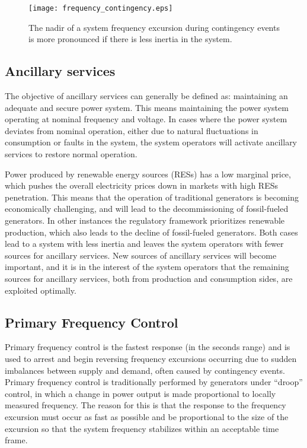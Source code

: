 \begin{figure}[htbp!]
\centering
\texttt{[image: frequency\_contingency.eps]}
\caption{The nadir of a system frequency excursion during contingency events is more pronounced if there is less inertia in the system.}
\label{fig:contingency}
\end{figure}

\subsection{Ancillary services}
The objective of ancillary services can generally be defined as: maintaining an adequate and secure power system. This means maintaining the power system operating at nominal frequency and voltage. In cases where the power system deviates from nominal operation, either due to natural fluctuations in consumption or faults in the system, the system operators will activate ancillary services to restore normal operation.

Power produced by renewable energy sources (RESs) has a low marginal price, which pushes the overall electricity prices down in markets with high RESs penetration. This means that the operation of traditional generators is becoming economically challenging, and will lead to the decommissioning of fossil-fueled generators. In other instances the regulatory framework prioritizes renewable production, which also leads to the decline of fossil-fueled generators\cite{eurelectric2015sector}. Both cases lead to a system with less inertia and leaves the system operators with fewer sources for ancillary services. New sources of ancillary services will become important, and it is in the interest of the system operators that the remaining sources for ancillary services, both from production and consumption sides, are exploited optimally.

\subsection*{Primary Frequency Control}
Primary frequency control is the fastest response (in the seconds range) and is used to arrest and begin reversing frequency excursions occurring due to sudden imbalances between supply and demand, often caused by contingency events. Primary frequency control is traditionally performed by generators under ``droop'' control, in which a  change in power output is made proportional to locally measured frequency. The reason for this is that the response to the frequency excursion must occur as fast as possible and be proportional to the size of the excursion so that the system frequency stabilizes within an acceptable time frame.
